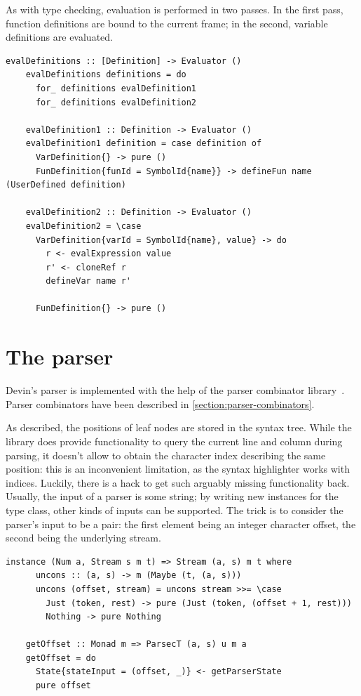 \documentclass[UdineBachThesis,american,11pt]{PhdThesis}
\begin{document}
  \newpage

  As with type checking, evaluation is performed in two passes. In the first
  pass, function definitions are bound to the current frame; in the second,
  variable definitions are evaluated.

  \begin{lstlisting}[gobble=4,basicstyle=\ttfamily\small]
    evalDefinitions :: [Definition] -> Evaluator ()
    evalDefinitions definitions = do
      for_ definitions evalDefinition1
      for_ definitions evalDefinition2

    evalDefinition1 :: Definition -> Evaluator ()
    evalDefinition1 definition = case definition of
      VarDefinition{} -> pure ()
      FunDefinition{funId = SymbolId{name}} -> defineFun name (UserDefined definition)

    evalDefinition2 :: Definition -> Evaluator ()
    evalDefinition2 = \case
      VarDefinition{varId = SymbolId{name}, value} -> do
        r <- evalExpression value
        r' <- cloneRef r
        defineVar name r'

      FunDefinition{} -> pure ()
  \end{lstlisting}

  \section{The parser}

  Devin's parser is implemented with the help of the \lstinline@parsec@ parser
  combinator library~\cite{parsec}. Parser combinators have been described in
  \autoref{section:parser-combinators}.

  As described, the positions of leaf nodes are stored in the syntax tree. While
  the \lstinline@parsec@ library does provide functionality to query the current
  line and column during parsing, it doesn't allow to obtain the character index
  describing the same position: this is an inconvenient limitation, as the
  syntax highlighter works with indices. Luckily, there is a hack to get such
  arguably missing functionality back. Usually, the input of a
  \lstinline@parsec@ parser is some string; by writing new instances for the
  \lstinline@Stream@ type class, other kinds of inputs can be supported. The
  trick is to consider the parser's input to be a pair: the first element being
  an integer character offset, the second being the underlying stream.

  \begin{lstlisting}[gobble=4,basicstyle=\ttfamily\small]
    instance (Num a, Stream s m t) => Stream (a, s) m t where
      uncons :: (a, s) -> m (Maybe (t, (a, s)))
      uncons (offset, stream) = uncons stream >>= \case
        Just (token, rest) -> pure (Just (token, (offset + 1, rest)))
        Nothing -> pure Nothing

    getOffset :: Monad m => ParsecT (a, s) u m a
    getOffset = do
      State{stateInput = (offset, _)} <- getParserState
      pure offset
  \end{lstlisting}
\end{document}

